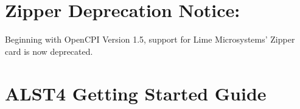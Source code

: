 \iffalse
This file is protected by Copyright. Please refer to the COPYRIGHT file
distributed with this source distribution.

This file is part of OpenCPI <http://www.opencpi.org>

OpenCPI is free software: you can redistribute it and/or modify it under the
terms of the GNU Lesser General Public License as published by the Free Software
Foundation, either version 3 of the License, or (at your option) any later
version.

OpenCPI is distributed in the hope that it will be useful, but WITHOUT ANY
WARRANTY; without even the implied warranty of MERCHANTABILITY or FITNESS FOR A
PARTICULAR PURPOSE. See the GNU Lesser General Public License for more details.

You should have received a copy of the GNU Lesser General Public License along
with this program. If not, see <http://www.gnu.org/licenses/>.
\fi

\def\comp{alst4}
\def\Comp{ALST4}
\def\docTitle{\Comp{} Getting Started Guide}
\def\snippetpath{../../../../../../doc/av/tex/snippets}



\maketitle
\thispagestyle{empty}
\newpage

\tableofcontents
\newpage

\section*{Zipper Deprecation Notice:}
Beginning with OpenCPI Version 1.5, support for Lime Microsystems' Zipper card is now deprecated.

\section*{ALST4 Getting Started Guide}
\setcounter{section}{0}

